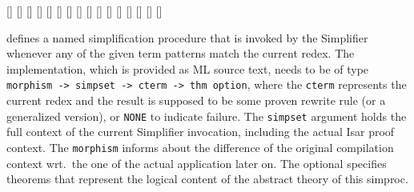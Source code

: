 \begin{isabellebody}
\begin{isamarkuptext}
  \begin{railoutput}
[]
[]
[]
\rail@plus
{}[]
[]
\rail@endplus
{}[]
[]
[]
\rail@bar
{}
[]
\rail@plus
{}[]
\rail@endplus
\rail@endbar
\rail@end
{}
[]
\rail@bar
\rail@bar
{}
[]
[]
\rail@endbar
{}
[]
[]
\rail@endbar
\rail@plus
{}[]
\rail@endplus
\rail@end
\end{railoutput}


  \begin{description}

  \item \hyperlink{command.simproc-setup}{\mbox{}} defines a named simplification
  procedure that is invoked by the Simplifier whenever any of the
  given term patterns match the current redex.  The implementation,
  which is provided as ML source text, needs to be of type \verb|morphism -> simpset -> cterm -> thm option|, where the \verb|cterm| represents the current redex  and the result is
  supposed to be some proven rewrite rule  (or a
  generalized version), or \verb|NONE| to indicate failure.  The
  \verb|simpset| argument holds the full context of the current
  Simplifier invocation, including the actual Isar proof context.  The
  \verb|morphism| informs about the difference of the original
  compilation context wrt.\ the one of the actual application later
  on.  The optional \hyperlink{keyword.identifier}{\mbox{}} specifies theorems that
  represent the logical content of the abstract theory of this
  simproc.


\end{description}
\end{isamarkuptext}
\end{isabellebody}

